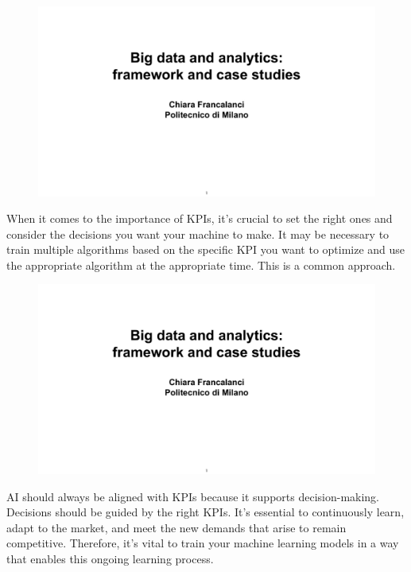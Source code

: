 \begin{figure}[!h]
    \centering
    \includegraphics[page=20, trim = 3cm 2.5cm 4cm 2.9cm, clip, width=\textwidth]{images/06 - BIG_DATA.pdf}
\end{figure}

When it comes to the importance of KPIs, it's crucial to set the right
ones and consider the decisions you want your machine to make. It may be
necessary to train multiple algorithms based on the specific KPI you
want to optimize and use the appropriate algorithm at the appropriate
time. This is a common approach.

\begin{figure}[!h]
    \centering
    \includegraphics[page=21, trim = 0cm 3cm 2.5cm 0.7cm, clip, width=\textwidth]{images/06 - BIG_DATA.pdf}
\end{figure}

AI should always be aligned with KPIs because it supports
decision-making. Decisions should be guided by the right KPIs. It's
essential to continuously learn, adapt to the market, and meet the new
demands that arise to remain competitive. Therefore, it's vital to train
your machine learning models in a way that enables this ongoing learning
process.

